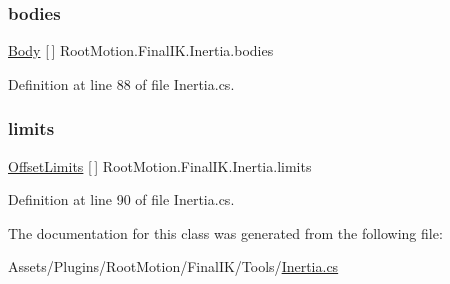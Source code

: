 \subsubsection{\texorpdfstring{bodies}{bodies}}
{\footnotesize\ttfamily \mbox{\hyperlink{class_root_motion_1_1_final_i_k_1_1_inertia_1_1_body}{Body}} \mbox{[}$\,$\mbox{]} Root\+Motion.\+Final\+I\+K.\+Inertia.\+bodies}



Definition at line 88 of file Inertia.\+cs.

\mbox{\label{class_root_motion_1_1_final_i_k_1_1_inertia_ad997e6d5f8d9565d489d24fae6c910a2}} 
\subsubsection{\texorpdfstring{limits}{limits}}
{\footnotesize\ttfamily \mbox{\hyperlink{class_root_motion_1_1_final_i_k_1_1_offset_modifier_1_1_offset_limits}{Offset\+Limits}} \mbox{[}$\,$\mbox{]} Root\+Motion.\+Final\+I\+K.\+Inertia.\+limits}



Definition at line 90 of file Inertia.\+cs.



The documentation for this class was generated from the following file\+:\begin{DoxyCompactItemize}
\item 
Assets/\+Plugins/\+Root\+Motion/\+Final\+I\+K/\+Tools/\mbox{\hyperlink{_inertia_8cs}{Inertia.\+cs}}\end{DoxyCompactItemize}
